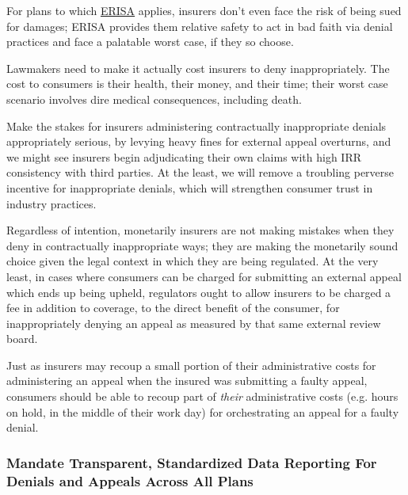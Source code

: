 \documentclass[12pt, a4paper,twoside,parskip=full]{report}
\theoremstyle{plain} %
\theoremstyle{definition} %
\theoremstyle{remark} %
\numberwithin{equation}{chapter}
\begin{document}
\begin{itemize}
			For plans to which \href{https://www.dol.gov/agencies/ebsa/laws-and-regulations/laws/erisa}{ERISA} applies, insurers
			don't even face the risk of being sued for damages; ERISA provides them relative safety to act in bad faith via denial practices
			and face a palatable worst case, if they so choose.
			
			Lawmakers need to make it actually cost insurers to deny inappropriately. The cost to consumers
			is their health, their money, and their time; their worst case scenario involves dire medical consequences, including death. 
			
			Make the stakes for insurers administering contractually inappropriate denials appropriately serious, by levying heavy fines 
			for external appeal overturns, and we might see insurers begin adjudicating their own claims with high IRR consistency with third parties.
			At the least, we will remove a troubling perverse incentive for inappropriate denials, which will strengthen
			consumer trust in industry practices.
			
			Regardless of intention, monetarily insurers are not making mistakes when they deny in contractually inappropriate ways; they are 
			making the monetarily sound choice given the legal context in which they are being regulated. At the very least, in cases where consumers 
			can be charged for submitting an external appeal which ends up being upheld, regulators ought to allow insurers to be charged a fee in 
			addition to coverage, to the direct benefit of the consumer, for inappropriately denying an appeal as measured by that same external review board.
			
			Just as insurers may recoup a small portion of their administrative costs for administering an appeal when the insured
			was submitting a faulty appeal, consumers should be able to recoup part of \emph{their} administrative costs (e.g. hours on hold,
			in the middle of their work day) for orchestrating an appeal for a faulty denial.
		
		\end{itemize}
		
		\subsubsection{Mandate Transparent, Standardized Data Reporting For Denials and Appeals Across All Plans}
		
\end{document}
